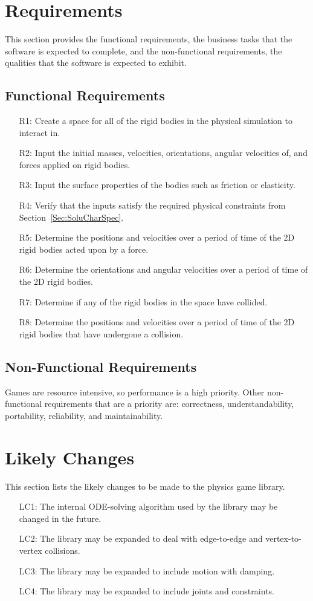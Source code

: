 \documentclass[12pt]{article}
\begin{document}
\section{Requirements}
\label{Sec:Requ}
This section provides the functional requirements, the business tasks that the software is expected to complete, and the non-functional requirements, the qualities that the software is expected to exhibit.
\subsection{Functional Requirements}
\label{Sec:FuncRequ}
\begin{itemize}
\item[R1:]Create a space for all of the rigid bodies in the physical simulation to interact in.
\item[R2:]Input the initial masses, velocities, orientations, angular velocities of, and forces applied on rigid bodies.
\item[R3:]Input the surface properties of the bodies such as friction or elasticity.
\item[R4:]Verify that the inputs satisfy the required physical constraints from Section~\ref{Sec:SoluCharSpec}.
\item[R5:]Determine the positions and velocities over a period of time of the 2D rigid bodies acted upon by a force.
\item[R6:]Determine the orientations and angular velocities over a period of time of the 2D rigid bodies.
\item[R7:]Determine if any of the rigid bodies in the space have collided.
\item[R8:]Determine the positions and velocities over a period of time of the 2D rigid bodies that have undergone a collision.
\end{itemize}
\subsection{Non-Functional Requirements}
\label{Sec:Non-Requ}
Games are resource intensive, so performance is a high priority. Other non-functional requirements that are a priority are: correctness, understandability, portability, reliability, and maintainability.
\section{Likely Changes}
\label{Sec:LikeChan}
This section lists the likely changes to be made to the physics game library.
\begin{itemize}
\item[LC1:]The internal ODE-solving algorithm used by the library may be changed in the future.
\item[LC2:]The library may be expanded to deal with edge-to-edge and vertex-to-vertex collisions.
\item[LC3:]The library may be expanded to include motion with damping.
\item[LC4:]The library may be expanded to include joints and constraints.
\end{itemize}
\end{document}
